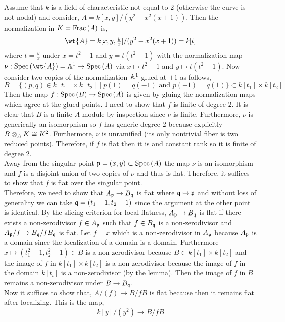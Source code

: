 \documentclass[12pt]{article}
\begin{document}
Assume that $k$ is a field of characteristic not equal to $2$ (otherwise the curve is not nodal) and consider, $A = k[x,y]/(y^2 - x^2(x + 1))$. Then the normalization in $K = \mathrm{Frac}\left(A\right)$ is,
\[ \wt{A} = k[x,y,\tfrac{y}{x}]/(y^2 - x^2(x + 1)) = k[t] \]
where $t = \frac{y}{x}$ under $x = t^2 - 1$ and $y = t(t^2 - 1)$ with the normalization map $\nu : \Spec{\wt{A}} = \A^1 \to \Spec{A}$ via $x \mapsto t^2 - 1$ and $y \mapsto t(t^2 - 1)$. Now consider two copies of the normalization $\mathbb{A}^1$ glued at $\pm 1$ as follows,
\[ B = \{ (p, q) \in k[t_1] \times k[t_2] \mid p(1) = q(-1) \text{ and } p(-1) = q(1) \} \subset k[t_1] \times k[t_2] \]
Then the map $f : \mathrm{Spec}\left( B \right) \to \mathrm{Spec}\left( A \right)$ is given by gluing the normalization maps which agree at the glued points. I need to show that $f$ is finite \etale of degree $2$. It is clear that $B$ is a finite $A$-module by inspection since $\nu$ is finite. Furthermore, $\nu$ is generically an isomorphism so $f$ has generic degree $2$ because explicitly $B \otimes_A K \cong K^2$. Furthermore, $\nu$ is unramified (its only nontrivial fiber is two reduced points). Therefore, if $f$ is flat then it is \etale and constant rank so it is finite \etale of degree $2$.
\bigskip\\
Away from the singular point $\mathfrak{p} = (x,y) \subset \mathrm{Spec}\left( A \right)$ the map $\nu$ is an isomorphism and $f$ is a disjoint union of two copies of $\nu$ and thus is flat. Therefore, it suffices to show that $f$ is flat over the singular point. 
\bigskip\\
Therefore, we need to show that $A_{\mathfrak{p}} \to B_{\mathfrak{q}}$ is flat where $\mathfrak{q} \mapsto \mathfrak{p}$ and without loss of generality we can take $\mathfrak{q} = (t_1 - 1, t_2 + 1)$ since the argument at the other point is identical. By the slicing criterion for local flatness, $A_{\mathfrak{p}} \to B_{\mathfrak{q}}$ is flat if there exists a non-zerodivisor $f \in A_{\mathfrak{p}}$ such that $f \in B_{\mathfrak{q}}$ is a non-zerodivisor and $A_{\mathfrak{p}} / f \to B_{\mathfrak{q}} / f B_{\mathfrak{q}}$ is flat. Let $f = x$ which is a non-zerodivisor in $A_{\mathfrak{p}}$ because $A_{\mathfrak{p}}$ is a domain since the localization of a domain is a domain. Furthermore $x \mapsto (t_1^2 - 1, t_2^2 - 1) \in B$ is a non-zerodivisor because $B \subset k[t_1] \times k[t_2]$ and the image of $f$ in $k[t_1] \times k[t_2]$ is a non-zerodivisor because the image of $f$ in the domain $k[t_i]$ is a non-zerodivisor (by the lemma). Then the image of $f$ in $B$ remains a non-zerodivisor under $B \to B_{\mathfrak{q}}$.
\bigskip\\
Now it suffices to show that, $A / (f) \to B / f B$ is flat because then it remains flat after localizing. This is the map,
\[ k[y]/(y^2) \to B / f B  \]
\end{document}
